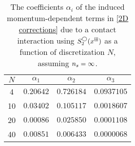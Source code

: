 \begin{table}
    \caption{The coefficients $\alpha_i$ of the induced momentum-dependent terms in \eqref{2D corrections} due to a contact interaction using $S^\bigcirc_2(x^\boxplus)$ as a function of discretization $N$, assuming ${n_s}=\infty$.
    }
    \label{tab:induced terms in 2 d}
    \begin{tabular}{c|ccc}
    $N$ &   $\alpha_1$      &   $\alpha_2$      & $\alpha_3$                \\
    \hline
    4   &   $0.20642$   &   $0.726184$ & $0.0937105$           \\
    10  &   $0.03402$   &   $0.105117$ & $0.0018607$           \\
    20  &   $0.00086$   &   $0.025850$ & $0.0001108$           \\
    40  &   $0.00851$   &   $0.006433$ & $0.0000068$    \\
\end{tabular}
\end{table}
